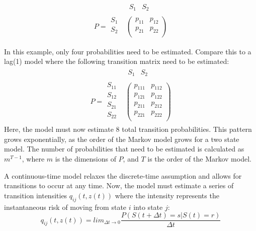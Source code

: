 \documentclass[12pt]{./styles/outhesis}
\begin{document}
\[
\begin{array}{ccc} &
\begin{array}{cccc} S_{1} & S_{2}\end{array}
\\
P=\begin{array}{cccc}
S_{1} \\
S_{2} \\
\end{array}
&
\left(
\begin{array}{cccc}
p_{11} & p_{12}  \\
p_{21} & p_{22}  \\
\end{array}
\right)\end{array}
\]

In this example, only four probabilities need to be estimated. Compare
this to a lag(1) model where the following transition matrix need to be
estimated: \[\begin{array}{ccc} &
\begin{array}{cccc} S_{1} & S_{2}\end{array}
\\
P=\begin{array}{cccc}
S_{11} \\
S_{12} \\
S_{21} \\
S_{22} \\
\end{array}
&
\left(
\begin{array}{cccc}
p_{111} & p_{112}  \\
p_{121} & p_{122}  \\
p_{211} & p_{212}  \\
p_{221} & p_{222}  \\
\end{array}
\right)\end{array}
\] Here, the model must now estimate 8 total transition probabilities.
This pattern grows exponentially, as the order of the Markov model grows
for a two state model. The number of probabilities that need to be
estimated is calculated as \(m^{T-1}\), where \(m\) is the dimensions of
\(P\), and \(T\) is the order of the Markov model.

A continuous-time model relaxes the discrete-time assumption and allows
for transitions to occur at any time. Now, the model must estimate a
series of transition intensities \(q_{ij}(t,z(t))\) where the intensity
represents the instantaneous risk of moving from state \(i\) into state
\(j\):
\[q_{ij}(t,z(t)) = lim_{\Delta t\rightarrow0} \frac{P(S(t+ \Delta t) = s|S(t) = r)}{\Delta t}\]
\end{document}
